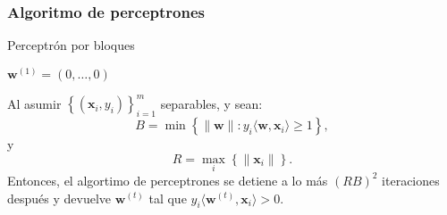 \documentclass[8pt,a4paper]{extarticle}
\begin{document}
\begin{multicols}{3}
\subsubsection{Algoritmo de perceptrones}

\begin{algorithm}[H]
	\caption{Perceptrón por bloques}
	$ \mathbf{w}^{(1)} = (0, \ldots, 0)$\\
\end{algorithm}

\begin{boxtheo}[]
	Al asumir $\left\{\left(\mathbf{x}_i, y_i \right)\right\}_{i=1}^m$ separables, y sean:
	$$B = \min \left\{ \| \mathbf{w} \| : y_i \langle \mathbf{w}, \mathbf{x}_i \rangle \ge 1 \right\},$$
	y
	$$\displaystyle R = \max_{i} \left\{ \| \mathbf{x}_i \| \right\}.$$
	Entonces, el algortimo de perceptrones se detiene a lo más $\left( RB \right)^2 $ iteraciones después y devuelve $\mathbf{w}^{(t)}$ tal que $y_i \langle \mathbf{w}^{(t)}, \mathbf{x}_i \rangle > 0$.
\end{boxtheo}

\vfill\eject
\columnbreak
\end{multicols}
\end{document}
